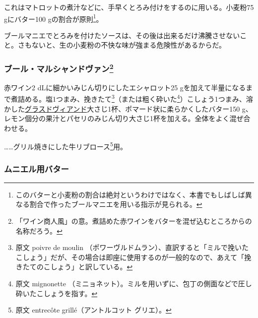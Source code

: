 \begin{recette}
これはマトロットの煮汁などに、手早くとろみ付けをするのに用いる。小麦粉75
gにバター100 gの割合が原則\footnote{このバターと小麦粉の割合は絶対というわけではなく、本書でもしばしば異なる割合で作ったブールマニエを用いる指示が見られる。}。

ブールマニエでとろみを付けたソースは、その後は出来るだけ沸騰させないこと。さもないと、生の小麦粉の不快な味が強まる危険性があるからだ。

\hypertarget{beurre-marchand-de-vin}{%
\subsubsection[ブール・マルシャンドヴァン]{\texorpdfstring{ブール・マルシャンドヴァン\footnote{「ワイン商人風」の意。煮詰めた赤ワインをバターを混ぜ込むところからの名称だろう。}}{ブール・マルシャンドヴァン}}\label{beurre-marchand-de-vin}}



赤ワイン2 dLに細かいみじん切りにしたエシャロット25
gを加えて半量になるまで煮詰める。塩1つまみ、挽きたて\footnote{原文
  poivre de moulin
  （ポワーヴルドムラン）、直訳すると「ミルで挽いたこしょう」だが、その場合は即座に使用するのが一般的なので、あえて「挽きたてのこしょう」と訳している。}（または粗く砕いた\footnote{原文
  mignonette
  （ミニョネット）。ミルを用いずに、包丁の側面などで圧し砕いたこしょうを指す。}）こしょう1つまみ、溶かした\protect\hyperlink{glace-de-viande}{グラスドヴィアンド}大さじ1杯、ポマード状に柔らかくしたバター150
g、レモン\unquart{}個分の果汁とパセリのみじん切り大さじ1杯を加える。全体をよく混ぜ合わせる。

\ldots{}\ldots{}グリル焼きにした牛リブロース\footnote{原文 entrecôte
  grillé（アントルコット グリエ）。}用。

\hypertarget{beurre-a-la-meuniere}{%
\subsubsection{ムニエル用バター}\label{beurre-a-la-meuniere}}


\end{recette}
